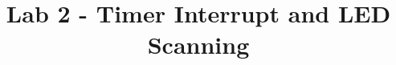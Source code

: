\documentclass[twoside,final]{hcmut-report}
\title{Lab 2 - Timer Interrupt and LED Scanning}
\begin{document}
\coverpage%

\tableofcontents

\clearpage


\end{document}
